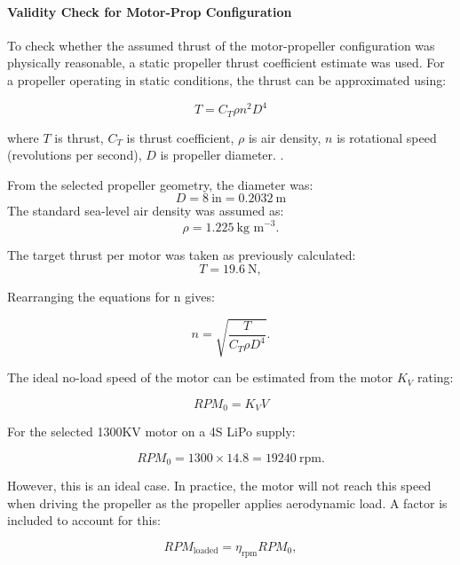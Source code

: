 \documentclass{report_template_oxford}
\begin{document}

\paragraph{Validity Check for Motor-Prop Configuration}

To check whether the assumed thrust of the motor-propeller configuration was physically reasonable, a static propeller thrust coefficient estimate was used. For a propeller operating in static conditions, the thrust can be approximated using:



\begin{equation}
T = C_T \rho n^2 D^4    
\end{equation}


where \(T\) is thrust, \(C_T\) is thrust coefficient, \(\rho\) is air density, \(n\) is rotational speed (revolutions per second), \(D\) is propeller diameter. \cite{mit_propeller_performance}.

From the selected propeller geometry, the diameter was:
\[D = 8~\text{in} =0.2032~\text{m}\]
The standard sea-level air density was assumed as:
\[\rho = 1.225~\text{kg m}^{-3}.\]

The target thrust per motor was taken as previously calculated:
\[T = 19.6~\text{N},\]

Rearranging the equations for n gives:

\begin{equation}
n = \sqrt{\frac{T}{C_T \rho D^4}}.
\end{equation}

The ideal no-load speed of the motor can be estimated from the motor \(K_V\) rating:

\begin{equation}
RPM_0= K_V V
\end{equation}

For the selected 1300KV motor on a 4S LiPo supply:

\[
RPM_0 = 1300 \times 14.8 = 19240~\text{rpm}.
\]

However, this is an ideal case. In practice, the motor will not reach this speed when driving the propeller as the propeller applies aerodynamic load. A factor is included to account for this:

\begin{equation}
RPM_{\text{loaded}} = \eta_{\text{rpm}} RPM_0,
\end{equation}
\end{document}
